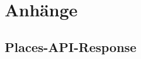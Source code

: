 \section{Anh\"ange}
\subsection{Places-API-Response}
\label{Places_API-Response Anhang}

\cite{PlacesAPIGoogle}